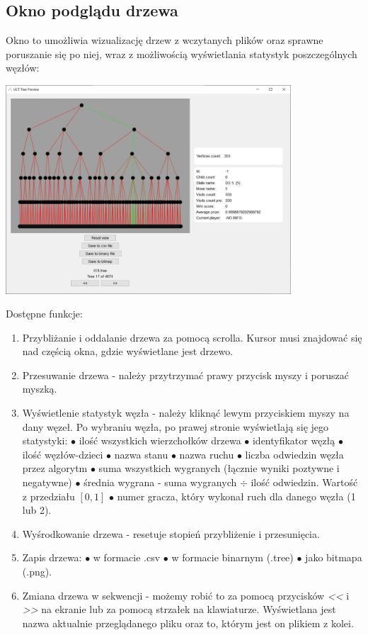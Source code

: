 \documentclass{article}
\begin{document}
\subsection{Okno podglądu drzewa}
Okno to umożliwia wizualizację drzew z wczytanych plików oraz sprawne poruszanie się po niej, wraz z możliwością wyświetlania statystyk poszczególnych węzłów:
\begin{center}
	\includegraphics[width=0.8\textwidth]{tree-window}
\end{center}
Dostępne funkcje:\\
\begin{enumerate}
	\item Przybliżanie i oddalanie drzewa za pomocą scrolla. Kursor musi znajdować się nad częścią okna, gdzie wyświetlane jest drzewo.\\
	\item Przesuwanie drzewa - należy przytrzymać prawy przycisk myszy i poruszać myszką.\\
	\item Wyświetlenie statystyk węzła - należy kliknąć lewym przyciskiem myszy na dany węzeł. Po wybraniu węzła, po prawej stronie wyświetlają się jego statystyki:
	\subitem $\bullet$ ilość wszystkich wierzchołków drzewa
	\subitem $\bullet$ identyfikator węzłą
	\subitem $\bullet$ ilość węzłów-dzieci
	\subitem $\bullet$ nazwa stanu
	\subitem $\bullet$ nazwa ruchu
	\subitem $\bullet$ liczba odwiedzin węzła przez algorytm
	\subitem $\bullet$ suma wszystkich wygranych (łącznie wyniki poztywne i negatywne)
	\subitem $\bullet$ średnia wygrana - suma wygranych $\div$ ilość odwiedzin. Wartość z przedziału $[0, 1]$
	\subitem $\bullet$ numer gracza, który wykonał ruch dla danego węzła (1 lub 2).\\
	\item Wyśrodkowanie drzewa - resetuje stopień przybliżenie i przesunięcia.\\
	\item Zapis drzewa:
	\subitem $\bullet$ w formacie .csv
	\subitem $\bullet$ w formacie binarnym (.tree)
	\subitem $\bullet$ jako bitmapa (.png).\\
	\item Zmiana drzewa w sekwencji - możemy robić to za pomocą przycisków \textit{<<} i \textit{>>} na ekranie lub za pomocą strzałek na klawiaturze. Wyświetlana jest nazwa aktualnie przeglądanego pliku oraz to, którym jest on plikiem z kolei.\\
\end{enumerate}
\end{document}
